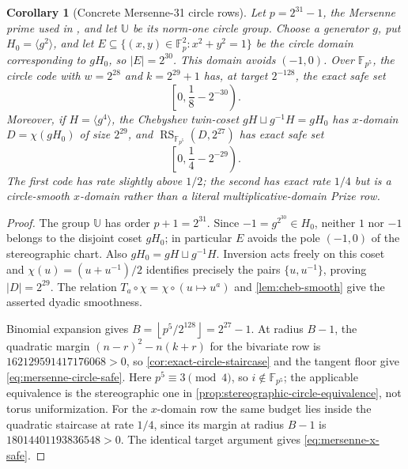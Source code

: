 \documentclass[11pt,a4paper]{amsart}
\numberwithin{equation}{section}
\newtheorem{corollary}[corollary]{Corollary}
\theoremstyle{remark}
\DeclareMathOperator{\RS}{RS}
\newcommand{\F}{\mathbb F}
\newcommand{\UU}{\mathbb U}
\newcommand{\abs}[1]{\lvert #1\rvert}
\newcommand{\floor}[1]{\left\lfloor #1\right\rfloor}
\begin{document}
\begin{corollary}[Concrete Mersenne-31 circle rows]
\label{cor:mersenne-circle-rows}
Let \(p=2^{31}-1\), the Mersenne prime used in \cite{HLP24}, and let
\(\UU\) be its norm-one circle group.
Choose a generator \(g\), put \(H_0=\langle g^2\rangle\), and let
\(E\subseteq\{(x,y)\in\F_p^2:x^2+y^2=1\}\) be the circle domain
corresponding to \(gH_0\), so \(\abs E=2^{30}\).  This domain avoids
\((-1,0)\).  Over \(\F_{p^5}\), the circle code with
\(w=2^{28}\) and \(k=2^{29}+1\) has, at target \(2^{-128}\),
the exact safe set
\[
\left[0,\frac18-2^{-30}\right).                 \tag{SC4}
\label{eq:mersenne-circle-safe}
\]
Moreover, if \(H=\langle g^4\rangle\), the Chebyshev twin-coset
\(gH\sqcup g^{-1}H=gH_0\) has \(x\)-domain
\(D=\chi(gH_0)\) of size \(2^{29}\), and
\(\RS_{\F_{p^5}}(D,2^{27})\) has exact safe set
\[
\left[0,\frac14-2^{-29}\right).                 \tag{SC5}
\label{eq:mersenne-x-safe}
\]
The first code has rate slightly above \(1/2\); the second has exact
rate \(1/4\) but is a circle-smooth \(x\)-domain rather than a literal
multiplicative-domain Prize row.
\end{corollary}

\begin{proof}
The group \(\UU\) has order \(p+1=2^{31}\).  Since
\(-1=g^{2^{30}}\in H_0\), neither \(1\) nor \(-1\) belongs to the
disjoint coset \(gH_0\); in particular \(E\) avoids the pole
\((-1,0)\) of the stereographic chart.  Also
\(gH_0=gH\sqcup g^{-1}H\).  Inversion acts freely on this coset and
\(\chi(u)=(u+u^{-1})/2\) identifies precisely the pairs
\(\{u,u^{-1}\}\), proving \(\abs D=2^{29}\).  The relation
\(T_a\circ\chi=\chi\circ(u\mapsto u^a)\) and
\cref{lem:cheb-smooth} give the asserted dyadic smoothness.

Binomial expansion gives
\(B=\floor{p^5/2^{128}}=2^{27}-1\).  At radius \(B-1\), the quadratic
margin \((n-r)^2-n(k+r)\) for the bivariate row is
\(162129591417176068>0\), so
\cref{cor:exact-circle-staircase} and the tangent floor give
\eqref{eq:mersenne-circle-safe}.  Here \(p^5\equiv3\pmod4\), so
\(i\notin\F_{p^5}\); the applicable equivalence is the stereographic
one in \cref{prop:stereographic-circle-equivalence}, not torus
uniformization.  For the \(x\)-domain row the same budget lies inside
the quadratic staircase at rate \(1/4\), since its margin at radius
\(B-1\) is \(18014401193836548>0\).  The identical target argument gives
\eqref{eq:mersenne-x-safe}.
\end{proof}
\end{document}
